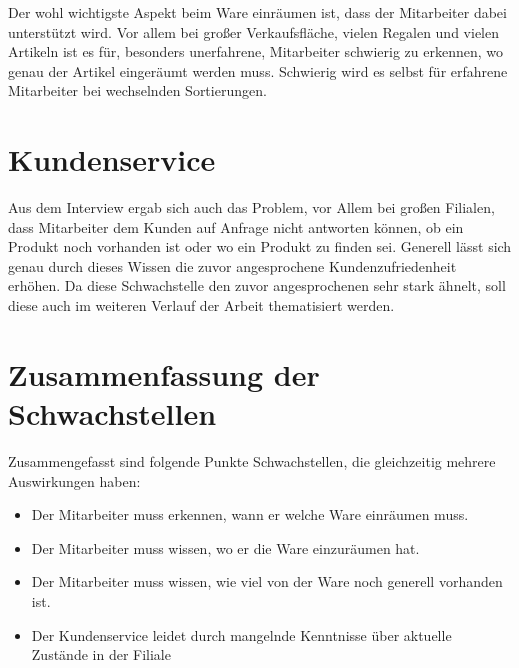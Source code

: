 Der wohl wichtigste Aspekt beim Ware einräumen ist, dass der Mitarbeiter dabei unterstützt wird. Vor allem bei großer Verkaufsfläche, vielen Regalen und vielen Artikeln ist es für, besonders unerfahrene, Mitarbeiter schwierig zu erkennen, wo genau der Artikel eingeräumt werden muss. Schwierig wird es selbst für erfahrene Mitarbeiter bei wechselnden Sortierungen.

\section{Kundenservice}
Aus dem Interview ergab sich auch das Problem, vor Allem bei großen Filialen, dass Mitarbeiter dem Kunden auf Anfrage nicht antworten können, ob ein Produkt noch vorhanden ist oder wo ein Produkt zu finden sei. Generell lässt sich genau durch dieses Wissen die zuvor angesprochene Kundenzufriedenheit erhöhen. Da diese Schwachstelle den zuvor angesprochenen sehr stark ähnelt, soll diese auch im weiteren Verlauf der Arbeit thematisiert werden. 
\section{Zusammenfassung der Schwachstellen}
Zusammengefasst sind folgende Punkte Schwachstellen, die gleichzeitig mehrere Auswirkungen haben:
\begin{itemize}
	\item Der Mitarbeiter muss erkennen, wann er welche Ware einräumen muss.
	\item Der Mitarbeiter muss wissen, wo er die Ware einzuräumen hat.
	\item Der Mitarbeiter muss wissen, wie viel von der Ware noch generell vorhanden ist.
	\item Der Kundenservice leidet durch mangelnde Kenntnisse über aktuelle Zustände in der Filiale
\end{itemize}

